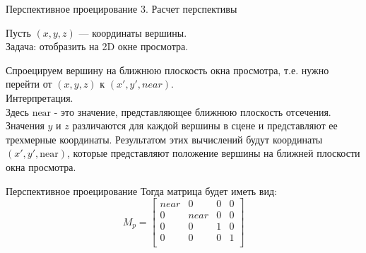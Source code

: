 \documentclass{beamer}
\begin{document}
	\begin{frame}{Перспективное проецирование}
		3. Расчет перспективы

		Пусть $(x, y, z)$ --- координаты вершины. \\ 
		Задача: отобразить на 2D окне просмотра.

    Спроецируем вершину на ближнюю плоскость окна просмотра, т.е. нужно перейти от $(x,y,z)$ к $(x',y',near)$. \\
		Интерпретация. \\
    Здесь $\text{near}$ - это значение, представляющее ближнюю плоскость отсечения. Значения $y$ и $z$ различаются для каждой вершины в сцене и представляют ее трехмерные координаты. Результатом этих вычислений будут координаты $(x', y', \text{near})$, которые представляют положение вершины на ближней плоскости окна просмотра.



	\end{frame}

	\begin{frame}{Перспективное проецирование}
		Тогда матрица будет иметь вид:
 \[
	M_p = 
	 \begin{bmatrix}
		near & 0 & 0 & 0 \\
		0 & near & 0 & 0 \\
		0 & 0 & 1 & 0 \\
		0 & 0 & 0 & 1 \\
	\end{bmatrix}	
	\]

	\end{frame}
\end{document}
